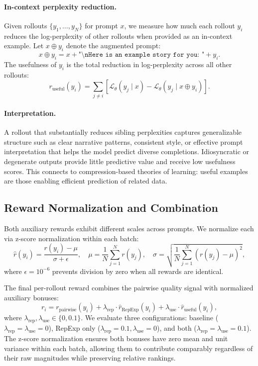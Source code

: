 \documentclass{article}
\theoremstyle{plain}
\theoremstyle{definition}
\theoremstyle{remark}
\begin{document}
\paragraph{In-context perplexity reduction.} Given rollouts $\{y_1, \ldots, y_N\}$ for prompt $x$, we measure how much each rollout $y_i$ reduces the log-perplexity of other rollouts when provided as an in-context example. Let $x \oplus y_i$ denote the augmented prompt:
\begin{equation}
x \oplus y_i = x + \texttt{"\textbackslash nHere is an example story for you: "} + y_i.
\end{equation}
The usefulness of $y_i$ is the total reduction in log-perplexity across all other rollouts:
\begin{equation}
r_{\text{useful}}(y_i) = \sum_{j \neq i} \left[ \mathcal{L}_\theta(y_j \mid x) - \mathcal{L}_\theta(y_j \mid x \oplus y_i) \right].
\end{equation}

\paragraph{Interpretation.} A rollout that substantially reduces sibling perplexities captures generalizable structure such as clear narrative patterns, consistent style, or effective prompt interpretation that helps the model predict diverse completions. Idiosyncratic or degenerate outputs provide little predictive value and receive low usefulness scores. This connects to compression-based theories of learning: useful examples are those enabling efficient prediction of related data.

\subsection{Reward Normalization and Combination}

Both auxiliary rewards exhibit different scales across prompts. We normalize each via z-score normalization within each batch:
\begin{equation}
\hat{r}(y_i) = \frac{r(y_i) - \mu}{\sigma + \epsilon}, \quad \mu = \frac{1}{N}\sum_{j=1}^{N} r(y_j), \quad \sigma = \sqrt{\frac{1}{N}\sum_{j=1}^{N} (r(y_j) - \mu)^2},
\end{equation}
where $\epsilon = 10^{-6}$ prevents division by zero when all rewards are identical.

The final per-rollout reward combines the pairwise quality signal with normalized auxiliary bonuses:
\begin{equation}
r_i = r_{\text{pairwise}}(y_i) + \lambda_{\text{rep}} \cdot \hat{r}_{\text{RepExp}}(y_i) + \lambda_{\text{use}} \cdot \hat{r}_{\text{useful}}(y_i),
\end{equation}
where $\lambda_{\text{rep}}, \lambda_{\text{use}} \in \{0, 0.1\}$. We evaluate three configurations: baseline ($\lambda_{\text{rep}} = \lambda_{\text{use}} = 0$), RepExp only ($\lambda_{\text{rep}} = 0.1, \lambda_{\text{use}} = 0$), and both ($\lambda_{\text{rep}} = \lambda_{\text{use}} = 0.1$). The z-score normalization ensures both bonuses have zero mean and unit variance within each batch, allowing them to contribute comparably regardless of their raw magnitudes while preserving relative rankings.
\end{document}
